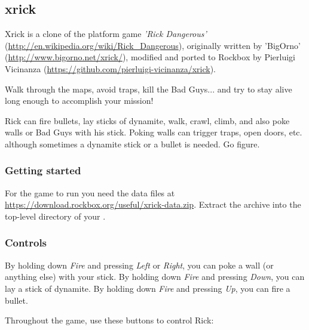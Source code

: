 \subsection{xrick}

Xrick is a clone of the platform game \emph{'Rick Dangerous'}
(\url{http://en.wikipedia.org/wiki/Rick_Dangerous}),
originally written by 'BigOrno'
(\url{http://www.bigorno.net/xrick/}),
modified and ported to Rockbox by Pierluigi Vicinanza
(\url{https://github.com/pierluigi-vicinanza/xrick}).

Walk through the maps, avoid traps, kill the Bad Guys... and
try to stay alive long enough to accomplish your mission!

Rick can fire bullets, lay sticks of dynamite, walk, crawl,
climb, and also poke walls or Bad Guys with his stick.
Poking walls can trigger traps, open doors, etc. although
sometimes a dynamite stick or a bullet is needed.
Go figure.

\subsubsection{Getting started}
For the game to run you need the data files at \url{https://download.rockbox.org/useful/xrick-data.zip}.  Extract the  archive into the top-level directory of your \dap.

\subsubsection{Controls}
By holding down \emph{Fire} and pressing \emph{Left} or \emph{Right},
you can poke a wall (or anything else) with your stick.
By holding down \emph{Fire} and pressing \emph{Down}, you can lay a stick of dynamite.
By holding down \emph{Fire} and pressing \emph{Up}, you can fire a bullet.

Throughout the game, use these buttons to control Rick:

